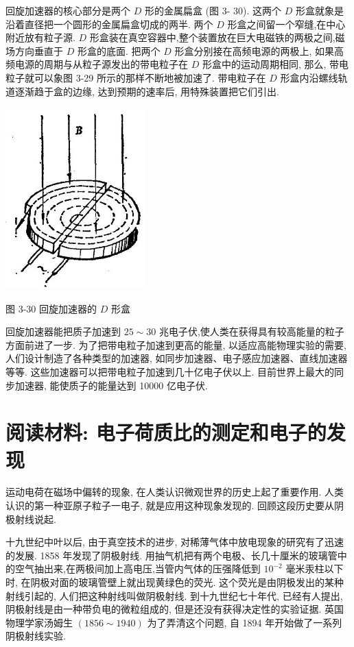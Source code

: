 \documentclass[10pt]{article}
\begin{document}
回旋加速器的核心部分是两个 \(D\) 形的金属扁盒 (图 3- 30). 这两个 \(D\) 形盒就象是沿着直径把一个圆形的金属扁盒切成的两半. 两个 \(D\) 形盒之间留一个窄缝,在中心附近放有粒子源. \(D\) 形盒装在真空容器中,整个装置放在巨大电磁铁的两极之间,磁场方向垂直于 \(D\) 形盒的底面. 把两个 \(D\) 形盒分别接在高频电源的两极上, 如果高频电源的周期与从粒子源发出的带电粒子在 \(D\) 形盒中的运动周期相同, 那么, 带电粒子就可以象图 3-29 所示的那样不断地被加速了. 带电粒子在 \(D\) 形盒内沿螺线轨道逐渐趋于盒的边缘, 达到预期的速率后, 用特殊装置把它们引出.

\begin{center}
\includegraphics[max width=0.4\textwidth]{images/01913056-1f15-74d8-9184-9aab52c9d66b_126_543587.jpg}
\end{center}

图 3-30 回旋加速器的 \(D\) 形盒

回旋加速器能把质子加速到 \({25} \sim {30}\) 兆电子伏,使人类在获得具有较高能量的粒子方面前进了一步. 为了把带电粒子加速到更高的能量, 以适应高能物理实验的需要, 人们设计制造了各种类型的加速器, 如同步加速器、电子感应加速器、直线加速器等等. 这些加速器可以把带电粒子加速到几十亿电子伏以上. 目前世界上最大的同步加速器, 能使质子的能量达到 10000 亿电子伏.

\section*{阅读材料: 电子荷质比的测定和电子的发现}

运动电荷在磁场中偏转的现象, 在人类认识微观世界的历史上起了重要作用. 人类认识的第一种亚原子粒子一电子, 就是应用这种现象发现的. 回顾这段历史要从阴极射线说起.

十九世纪中叶以后, 由于真空技术的进步, 对稀薄气体中放电现象的研究有了迅速的发展. 1858 年发现了阴极射线. 用抽气机把有两个电极、长几十厘米的玻璃管中的空气抽出来,在两极间加上高电压,当管内气体的压强降低到 \({10}^{-2}\) 毫米汞柱以下时, 在阴极对面的玻璃管壁上就出现黄绿色的荧光. 这个荧光是由阴极发出的某种射线引起的, 人们把这种射线叫做阴极射线. 到十九世纪七十年代, 已经有人提出, 阴极射线是由一种带负电的微粒组成的, 但是还没有获得决定性的实验证据. 英国物理学家汤姆生 \(\left( {{1856} \sim {1940}}\right)\) 为了弄清这个问题, 自 1894 年开始做了一系列阴极射线实验.
\end{document}
